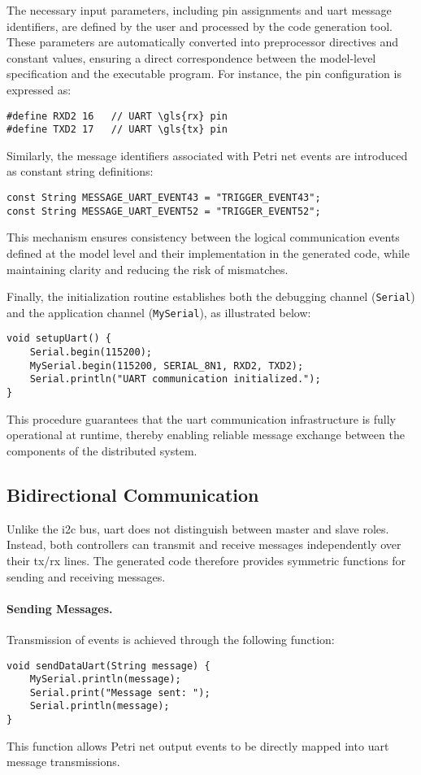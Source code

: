 The necessary input parameters, including pin assignments and \gls{uart} message identifiers, are defined by the user and processed by the code generation tool. These parameters are automatically converted into preprocessor directives and constant values, ensuring a direct correspondence between the model-level specification and the executable program. For instance, the pin configuration is expressed as:
\begin{verbatim}
#define RXD2 16   // UART \gls{rx} pin
#define TXD2 17   // UART \gls{tx} pin
\end{verbatim}

Similarly, the message identifiers associated with Petri net events are introduced as constant string definitions:
\begin{verbatim}
const String MESSAGE_UART_EVENT43 = "TRIGGER_EVENT43";
const String MESSAGE_UART_EVENT52 = "TRIGGER_EVENT52";
\end{verbatim}
This mechanism ensures consistency between the logical communication events defined at the model level and their implementation in the generated code, while maintaining clarity and reducing the risk of mismatches.

Finally, the initialization routine establishes both the debugging channel (\texttt{Serial}) and the application channel (\texttt{MySerial}), as illustrated below:
\begin{verbatim}
void setupUart() {
    Serial.begin(115200);
    MySerial.begin(115200, SERIAL_8N1, RXD2, TXD2);
    Serial.println("UART communication initialized.");
}
\end{verbatim}
This procedure guarantees that the \gls{uart} communication infrastructure is fully operational at runtime, thereby enabling reliable message exchange between the components of the distributed system.



\subsection{Bidirectional Communication}
Unlike the \gls{i2c} bus, \gls{uart} does not distinguish between master and slave roles. Instead, both controllers can transmit and receive messages independently over their \gls{tx}/\gls{rx} lines. The generated code therefore provides symmetric functions for sending and receiving messages.

\paragraph{Sending Messages.}  
Transmission of events is achieved through the following function:
\begin{verbatim}
void sendDataUart(String message) {
    MySerial.println(message);
    Serial.print("Message sent: ");
    Serial.println(message);
}
\end{verbatim}
This function allows Petri net output events to be directly mapped into \gls{uart} message transmissions.

